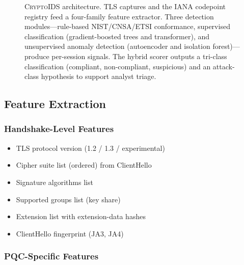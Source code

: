 \documentclass[sigconf,nonacm]{acmart}
\begin{document}
\begin{figure}[t]
\caption{\textsc{CryptoIDS} architecture. TLS captures and the
  IANA codepoint registry feed a four-family feature extractor.
  Three detection modules---rule-based NIST/CNSA/ETSI conformance,
  supervised classification (gradient-boosted trees and transformer),
  and unsupervised anomaly detection (autoencoder and isolation
  forest)---produce per-session signals. The hybrid scorer outputs
  a tri-class classification (compliant, non-compliant, suspicious)
  and an attack-class hypothesis to support analyst triage.}
\label{fig:framework}
\end{figure}

\subsection{Feature Extraction}

\subsubsection{Handshake-Level Features}

\begin{itemize}
  \item TLS protocol version (1.2 / 1.3 / experimental)
  \item Cipher suite list (ordered) from ClientHello
  \item Signature algorithms list
  \item Supported groups list (key share)
  \item Extension list with extension-data hashes
  \item ClientHello fingerprint (JA3, JA4)
\end{itemize}

\subsubsection{PQC-Specific Features}
\end{document}
